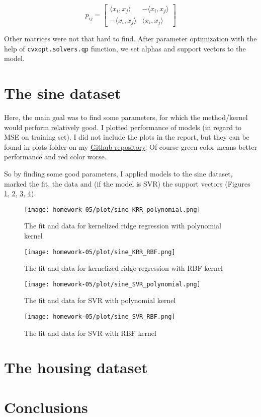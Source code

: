 \documentclass{article}
\begin{document}
\[
p_{ij} = \begin{bmatrix}
\langle x_i, x_j \rangle & -\langle x_i, x_j \rangle \\
-\langle x_i, x_j \rangle & \langle x_i, x_j \rangle
\end{bmatrix}
\]

Other matrices were not that hard to find. After parameter optimization with the help of \texttt{cvxopt.solvers.qp} function, we set alphas and support vectors to the model.

\section{The sine dataset}

Here, the main goal was to find some parameters, for which the method/kernel would perform relatively good. I plotted performance of models (in regard to MSE on training set). I did not include the plots in the report, but they can be found in plots folder on my \href{https://github.com/majbc1999/ml-for-data-science-homeworks} {Github repository}. Of course green color means better performance and red color worse.

So by finding some good parameters, I applied models to the sine dataset, marked the fit, the data and (if the model is SVR) the support vectors (Figures \ref{fig:sine_KRR_polynomial}, \ref{fig:sine_KRR_RBF}, \ref{fig:sine_SVR_polynomial}, \ref{fig:sine_SVR_RBF}).

\begin{figure}[!h]
    \centering
    \texttt{[image: homework-05/plot/sine\_KRR\_polynomial.png]}
    \caption{The fit and data for kernelized ridge regression with polynomial kernel}
    \label{fig:sine_KRR_polynomial}
\end{figure}

\begin{figure}[!h]
    \centering
    \texttt{[image: homework-05/plot/sine\_KRR\_RBF.png]}
    \caption{The fit and data for kernelized ridge regression with RBF kernel}
    \label{fig:sine_KRR_RBF}
\end{figure}

\begin{figure}[!h]
    \centering
    \texttt{[image: homework-05/plot/sine\_SVR\_polynomial.png]}
    \caption{The fit and data for SVR with polynomial kernel}
    \label{fig:sine_SVR_polynomial}
\end{figure}

\begin{figure}[!h]
    \centering
    \texttt{[image: homework-05/plot/sine\_SVR\_RBF.png]}
    \caption{The fit and data for SVR with RBF kernel}
    \label{fig:sine_SVR_RBF}
\end{figure}



\section{The housing dataset}

\section{Conclusions}


\printbibliography
\end{document}
